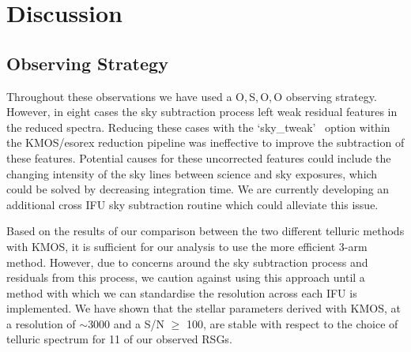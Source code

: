 \documentclass[manuscript]{aastex}
\begin{document}



\section{Discussion} %
\label{sec:discussion}

\subsection{Observing Strategy} %
\label{sub:observing_strategy}

Throughout these observations we have used a O,\,S,\,O,\,O observing strategy.
However, in eight cases the sky subtraction process left weak residual features in the reduced spectra.
Reducing these cases with the \textquoteleft sky\_tweak\textquoteright
~option within the KMOS/esorex reduction pipeline was ineffective to improve the subtraction of these features.
Potential causes for these uncorrected features could include the changing intensity of the sky lines between science and sky exposures,
which could be solved by decreasing integration time.
We are currently developing an additional cross IFU sky subtraction routine which could alleviate this issue.


Based on the results of our comparison between the two different telluric methods with KMOS,
it is sufficient for our analysis to use the more efficient 3-arm method.
However, due to concerns around the sky subtraction process and residuals from this process,
we caution against using this approach until a method with which we can standardise the resolution across each IFU is implemented.
We have shown that the stellar parameters derived with KMOS, at a resolution of $\sim$3000 and a S/N $\ge$ 100, are stable with respect to the choice of telluric spectrum for 11 of our observed RSGs.
\end{document}
